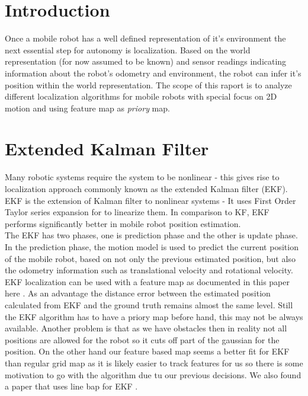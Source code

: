 \documentclass[12pt, a4paper, onecolumn]{article}
\begin{document}
\maketitle

\section{Introduction}

Once a mobile robot has a well defined representation of it's environment the next essential step for autonomy is localization.
Based on the world representation (for now assumed to be known) and sensor readings indicating information about the robot's odometry and environment, the robot can infer it's position within the world representation. 
The scope of this raport is to analyze different localization algorithms for mobile robots with special focus on 2D motion and using feature map as \emph{priory} map.

\section{Extended Kalman Filter}

Many robotic systems require the system to be nonlinear - this gives rise to localization approach commonly known as the extended Kalman filter (EKF)\cite{Overview2021}.
EKF is the extension of Kalman filter to nonlinear systems -
It uses First Order Taylor series expansion for to linearize them\cite{Overview2021}.
In comparison to KF, EKF performs significantly better in mobile robot position estimation\cite{Suliman2010}. \\

The EKF has two phases, one is prediction phase and the other is update phase. 
In the prediction phase, the motion model is used to predict the current position of the mobile robot, based on not only the previous estimated position, but also the odometry information such as translational velocity and rotational velocity. \cite{featureEKF} \\

EKF localization can be used with a feature map as documented in this paper here \cite{featureEKF}. 
As an advantage the distance error between the estimated position calculated from EKF and the ground truth remains almost the same level\cite{Overview2021}. 
Still the EKF algorithm has to have a priory map before hand, this may not be always available. \cite{featureEKF}
Another problem is that as we have obstacles then in reality not all positions are allowed for the robot so it cuts off part of the gaussian for the position.
On the other hand our feature based map seems a better fit for EKF than regular grid map as it is likely easier to track features for us so there is some motivation to go with the algorithm due tu our previous decisions.
We also found a paper that uses line bap for EKF \cite{lineEKF}.
\end{document}
